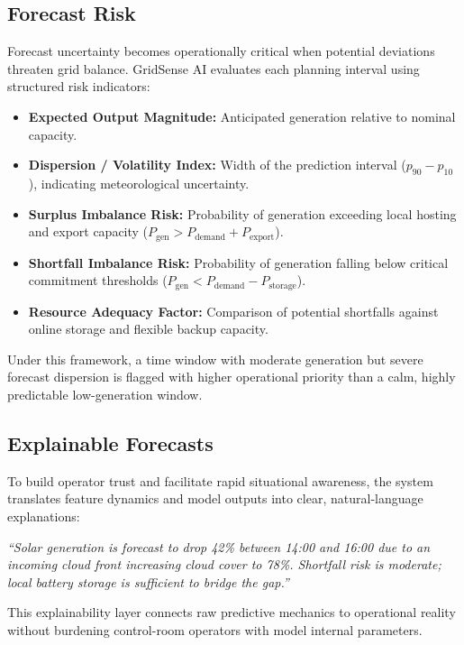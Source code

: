 \subsection{Forecast Risk}
\label{subsec:forecast_risk}

Forecast uncertainty becomes operationally critical when potential deviations threaten grid balance. GridSense AI evaluates each planning interval using structured risk indicators:
\begin{itemize}[leftmargin=1.8em, itemsep=0.2em]
    \item \textbf{Expected Output Magnitude:} Anticipated generation relative to nominal capacity.
    \item \textbf{Dispersion / Volatility Index:} Width of the prediction interval ($p_{90} - p_{10}$), indicating meteorological uncertainty.
    \item \textbf{Surplus Imbalance Risk:} Probability of generation exceeding local hosting and export capacity ($P_{\text{gen}} > P_{\text{demand}} + P_{\text{export}}$).
    \item \textbf{Shortfall Imbalance Risk:} Probability of generation falling below critical commitment thresholds ($P_{\text{gen}} < P_{\text{demand}} - P_{\text{storage}}$).
    \item \textbf{Resource Adequacy Factor:} Comparison of potential shortfalls against online storage and flexible backup capacity.
\end{itemize}

Under this framework, a time window with moderate generation but severe forecast dispersion is flagged with higher operational priority than a calm, highly predictable low-generation window.

\subsection{Explainable Forecasts}
\label{subsec:explainable_forecasts}

To build operator trust and facilitate rapid situational awareness, the system translates feature dynamics and model outputs into clear, natural-language explanations:
\begin{center}
    \emph{``Solar generation is forecast to drop 42\% between 14:00 and 16:00 due to an incoming cloud front increasing cloud cover to 78\%. Shortfall risk is moderate; local battery storage is sufficient to bridge the gap.''}
\end{center}

This explainability layer connects raw predictive mechanics to operational reality without burdening control-room operators with model internal parameters.

